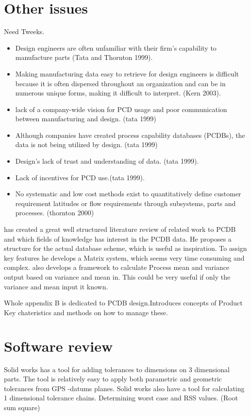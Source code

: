 \documentclass[aip,amsmath,reprint, author-year]{revtex4-1}
\begin{document}
\section{Other issues}

Need Tweeks. 

\begin{itemize}

\item{Design engineers are often unfamiliar with their firm’s capability to manufacture parts (Tata and Thornton 1999).}
\item{Making manufacturing data easy to retrieve for design engineers is difficult because it is often dispersed throughout an organization and can be in numerous unique forms, making it difficult to interpret. (Kern 2003).}
\item{lack of a company-wide vision for PCD usage and poor communication between manufacturing and design. (tata 1999)}
\item{Although companies have created process capability databases (PCDBs), the data is not being utilized by design. (tata 1999)}
\item{Design’s lack of trust and understanding of data. (tata 1999).}
\item{Lack of incentives for PCD use.(tata 1999).}
\item{No systematic and low cost methods exist to quantitatively define customer requirement latitudes or flow requirements through subsystems, parts and processes. (thornton 2000)}

\end{itemize} 


\citet{kern2003forecasting} has created a great well structured literature review of related work to PCDB and which fields of knowledge has interest in the PCDB data. 
He proposes a structure for the actual database scheme, which is useful as inspiration. 
To assign key features he develops a Matrix system, which seems very time consuming and complex. 
\citet{kern2003forecasting} also develops a framework to calculate Process mean and variance output based on variance and mean in. 
This could be very useful if only the variance and mean input it known.

\citet{thornton2004variation} Whole appendix B is dedicated to PCDB design.Introduces concepts of Product Key chateristics and methods on how to manage these.

\section{Software review}
Solid works has a tool for adding tolerances to dimensions on 3 dimensional parts.
The tool is relatively easy to apply both parametric and geometric tolerances from GPS -datums planes. 
Solid works also have a tool for calculating 1 dimensional tolerance chains. 
Determining worst case and RSS values. (Root sum square)
\end{document}
